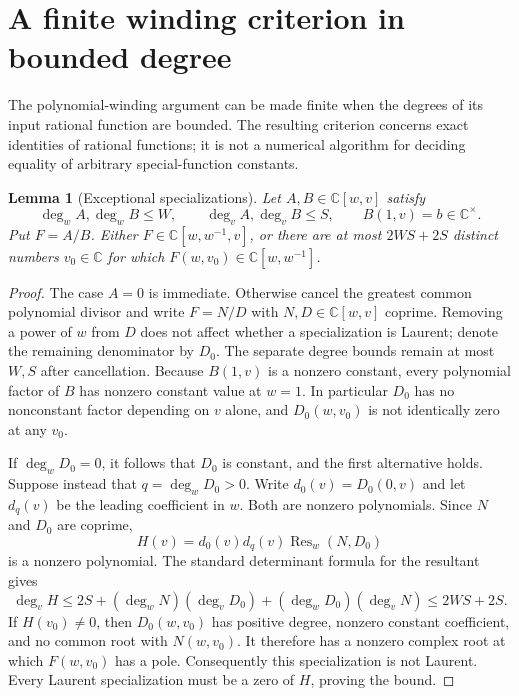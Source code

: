 \documentclass[11pt,a4paper]{article}
\newtheorem{lemma}[theorem]{Lemma}
\theoremstyle{definition}\newtheorem{definition}[theorem]{Definition}
\theoremstyle{remark}\newtheorem{remark}[theorem]{Remark}
\begin{document}
\section{A finite winding criterion in bounded degree}
\label{finitewind:section}

The polynomial-winding argument can be made finite when the degrees of
its input rational function are bounded. The resulting criterion concerns
exact identities of rational functions; it is not a numerical algorithm
for deciding equality of arbitrary special-function constants.

\begin{lemma}[Exceptional specializations]\label{finitewind:lemma}
Let $A,B\in\mathbb C[w,v]$ satisfy
\[
 \deg_w A,\deg_w B\le W,\qquad
 \deg_v A,\deg_v B\le S,
 \qquad B(1,v)=b\in\mathbb C^\times.
\]
Put $F=A/B$. Either
$F\in\mathbb C[w,w^{-1},v]$, or there are at most
$2WS+2S$ distinct numbers $v_0\in\mathbb C$ for which
$F(w,v_0)\in\mathbb C[w,w^{-1}]$.
\end{lemma}

\begin{proof}
The case $A=0$ is immediate. Otherwise cancel the greatest common
polynomial divisor and write $F=N/D$ with $N,D\in\mathbb C[w,v]$
coprime. Removing a power of $w$ from $D$ does not affect whether a
specialization is Laurent; denote the remaining denominator by $D_0$.
The separate degree bounds remain at most $W,S$ after cancellation.
Because $B(1,v)$ is a nonzero constant, every polynomial factor of $B$
has nonzero constant value at $w=1$. In particular $D_0$ has no
nonconstant factor depending on $v$ alone, and $D_0(w,v_0)$ is not
identically zero at any $v_0$.

If $\deg_wD_0=0$, it follows that $D_0$ is constant, and the first
alternative holds. Suppose instead that $q=\deg_wD_0>0$. Write
$d_0(v)=D_0(0,v)$ and let $d_q(v)$ be the leading coefficient in $w$.
Both are nonzero polynomials. Since $N$ and $D_0$ are coprime,
\[
 H(v)=d_0(v)d_q(v)\operatorname{Res}_w(N,D_0)
\]
is a nonzero polynomial. The standard determinant formula for the
resultant gives
\[
 \deg_v H\le 2S+
  (\deg_wN)(\deg_vD_0)+(\deg_wD_0)(\deg_vN)
 \le 2WS+2S.
\]
If $H(v_0)\ne0$, then $D_0(w,v_0)$ has positive degree, nonzero
constant coefficient, and no common root with $N(w,v_0)$.
It therefore has a nonzero complex root at which $F(w,v_0)$ has a
pole. Consequently this specialization is not Laurent. Every Laurent
specialization must be a zero of $H$, proving the bound.
\end{proof}
\end{document}
